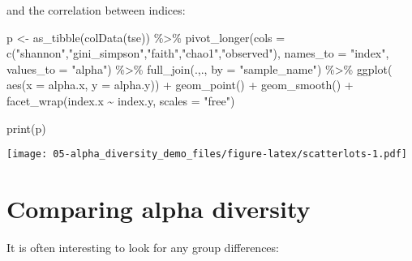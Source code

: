 \documentclass[
  oneside]{book}
\newenvironment{Shaded}{\begin{snugshade}}{\end{snugshade}}
\newcommand{\AttributeTok}[1]{\textcolor[rgb]{0.77,0.63,0.00}{#1}}
\newcommand{\FunctionTok}[1]{\textcolor[rgb]{0.00,0.00,0.00}{#1}}
\newcommand{\NormalTok}[1]{#1}
\newcommand{\OtherTok}[1]{\textcolor[rgb]{0.56,0.35,0.01}{#1}}
\newcommand{\SpecialCharTok}[1]{\textcolor[rgb]{0.00,0.00,0.00}{#1}}
\newcommand{\StringTok}[1]{\textcolor[rgb]{0.31,0.60,0.02}{#1}}
\begin{document}
and the correlation between indices:

\begin{Shaded}
\begin{Highlighting}[]
\NormalTok{p }\OtherTok{\textless{}{-}} \FunctionTok{as\_tibble}\NormalTok{(}\FunctionTok{colData}\NormalTok{(tse)) }\SpecialCharTok{\%\textgreater{}\%} 
  \FunctionTok{pivot\_longer}\NormalTok{(}\AttributeTok{cols =} \FunctionTok{c}\NormalTok{(}\StringTok{"shannon"}\NormalTok{,}\StringTok{"gini\_simpson"}\NormalTok{,}\StringTok{"faith"}\NormalTok{,}\StringTok{"chao1"}\NormalTok{,}\StringTok{"observed"}\NormalTok{), }\AttributeTok{names\_to =} \StringTok{"index"}\NormalTok{, }\AttributeTok{values\_to =} \StringTok{"alpha"}\NormalTok{) }\SpecialCharTok{\%\textgreater{}\%} 
  \FunctionTok{full\_join}\NormalTok{(.,., }\AttributeTok{by =} \StringTok{"sample\_name"}\NormalTok{) }\SpecialCharTok{\%\textgreater{}\%} 
  \FunctionTok{ggplot}\NormalTok{( }\FunctionTok{aes}\NormalTok{(}\AttributeTok{x =}\NormalTok{ alpha.x, }\AttributeTok{y =}\NormalTok{ alpha.y)) }\SpecialCharTok{+} 
  \FunctionTok{geom\_point}\NormalTok{() }\SpecialCharTok{+}
  \FunctionTok{geom\_smooth}\NormalTok{() }\SpecialCharTok{+}
  \FunctionTok{facet\_wrap}\NormalTok{(index.x }\SpecialCharTok{\textasciitilde{}}\NormalTok{ index.y, }\AttributeTok{scales =} \StringTok{"free"}\NormalTok{)}

\FunctionTok{print}\NormalTok{(p)}
\end{Highlighting}
\end{Shaded}

\texttt{[image: 05-alpha\_diversity\_demo\_files/figure-latex/scatterlots-1.pdf]}

\hypertarget{comparing-alpha-diversity}{%
\section{Comparing alpha diversity}\label{comparing-alpha-diversity}}

It is often interesting to look for any group differences:
\end{document}
